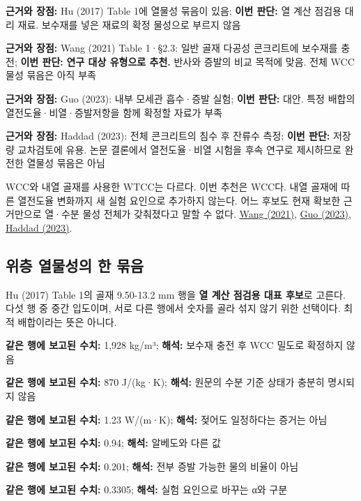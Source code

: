 \documentclass[11pt,a4paper]{article}
\begin{document}
\begin{description}[leftmargin=0pt,style=nextline]
\item[일반 투수성 콘크리트] \textbf{근거와 장점:} Hu (2017) Table 1에 열물성 묶음이 있음; \textbf{이번 판단:} 열 계산 점검용 대리 재료. 보수재를 넣은 재료의 확정 물성으로 부르지 않음
\item[보수재 충전 콘크리트 WCC] \textbf{근거와 장점:} Wang (2021) Table 1·§2.3: 일반 골재 다공성 콘크리트에 보수재를 충전; \textbf{이번 판단:} \textbf{연구 대상 유형으로 추천.} 반사와 증발의 비교 목적에 맞음. 전체 WCC 물성 묶음은 아직 부족
\item[제올라이트 개질 콘크리트] \textbf{근거와 장점:} Guo (2023): 내부 모세관 흡수·증발 실험; \textbf{이번 판단:} 대안. 특정 배합의 열전도율·비열·증발저항을 함께 확정할 자료가 부족
\item[재생골재 보수성 콘크리트] \textbf{근거와 장점:} Haddad (2023): 전체 콘크리트의 침수 후 잔류수 측정; \textbf{이번 판단:} 저장량 교차검토에 유용. 논문 결론에서 열전도율·비열 시험을 후속 연구로 제시하므로 완전한 열물성 묶음은 아님
\end{description}

WCC와 내열 골재를 사용한 WTCC는 다르다. 이번 추천은 WCC다. 내열 골재에 따른 열전도율 변화까지 새 실험 요인으로 추가하지 않는다. 어느 후보도 현재 확보한 근거만으로 열·수분 물성 전체가 갖춰졌다고 말할 수 없다. \href{\detokenize{https://doi.org/10.3390/ma14206141}}{Wang (2021)}, \href{\detokenize{https://doi.org/10.3390/su15032092}}{Guo (2023)}, \href{\detokenize{https://doi.org/10.3390/su15065384}}{Haddad (2023)}.

\subsection{위층 열물성의 한 묶음}

Hu (2017) Table 1의 골재 9.50-13.2 mm 행을 \textbf{열 계산 점검용 대표 후보}로 고른다. 다섯 행 중 중간 입도이며, 서로 다른 행에서 숫자를 골라 섞지 않기 위한 선택이다. 최적 배합이라는 뜻은 아니다.

\begin{description}[leftmargin=0pt,style=nextline]
\item[겉보기 밀도] \textbf{같은 행에 보고된 수치:} 1,928 kg/m³; \textbf{해석:} 보수재 충전 후 WCC 밀도로 확정하지 않음
\item[비열] \textbf{같은 행에 보고된 수치:} 870 J/(kg·K); \textbf{해석:} 원문의 수분 기준 상태가 충분히 명시되지 않음
\item[열전도율] \textbf{같은 행에 보고된 수치:} 1.23 W/(m·K); \textbf{해석:} 젖어도 일정하다는 증거는 아님
\item[장파 방사율] \textbf{같은 행에 보고된 수치:} 0.94; \textbf{해석:} 알베도와 다른 값
\item[공극률] \textbf{같은 행에 보고된 수치:} 0.201; \textbf{해석:} 전부 증발 가능한 물의 비율이 아님
\item[원문 알베도] \textbf{같은 행에 보고된 수치:} 0.3305; \textbf{해석:} 실험 요인으로 바꾸는 α와 구분
\end{description}
\end{document}
